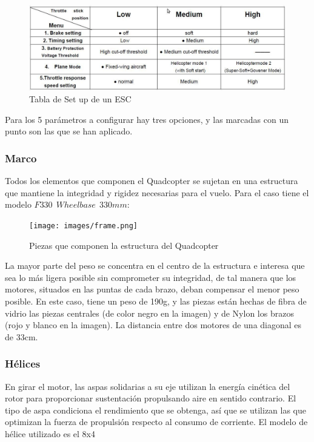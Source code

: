 \documentclass[twoside,11pt]{book}
\begin{document}
\begin{figure}[h!]
\begin{center}
\includegraphics[scale=0.45,bb=0 0 1053 352]{images/ESC_config.png}
\caption{Tabla de Set up de un ESC}
\end{center}
\end{figure}

Para los 5 parámetros a configurar hay tres opciones, y las marcadas con un punto son las que se han aplicado.

\subsubsection*{Marco}

Todos los elementos que componen el Quadcopter se sujetan en una estructura que mantiene la integridad y rigidez necesarias para el vuelo. Para el caso tiene el modelo $F330\>\>Wheelbase\>\>330mm$:

\begin{figure}[h!]
\begin{center}
\texttt{[image: images/frame.png]}
\caption{Piezas que componen la estructura del Quadcopter}
\end{center}
\end{figure}

La mayor parte del peso se concentra en el centro de la estructura e interesa que sea lo más ligera posible sin comprometer su integridad, de tal manera que los motores, situados en las puntas de cada brazo, deban compensar el menor peso posible. En este caso, tiene un peso de 190g, y las piezas están hechas de fibra de vidrio las piezas centrales (de color negro en la imagen) y de Nylon los brazos (rojo y blanco en la imagen). La distancia entre dos motores de una diagonal es de 33cm.


\subsubsection*{Hélices}

En girar el motor, las aspas solidarias a su eje utilizan la energía cinética del rotor para proporcionar sustentación propulsando aire en sentido contrario. El tipo de aspa condiciona el rendimiento que se obtenga, así que se utilizan las que optimizan la fuerza de propulsión respecto al consumo de corriente. El modelo de hélice utilizado es el 8x4
\end{document}
